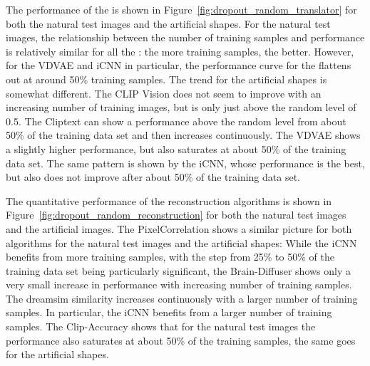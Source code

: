 The performance of the  is shown in Figure~\ref{fig:dropout_random_translator} for both the natural test images and the artificial shapes. For the natural test images, the relationship between the number of training samples and performance is relatively similar for all the : the more training samples, the better. However, for the VDVAE and iCNN in particular, the performance curve for the  flattens out at around 50\% training samples. The trend for the artificial shapes is somewhat different. The CLIP Vision  does not seem to improve with an increasing number of training images, but is only just above the random level of 0.5. The Cliptext  can show a performance above the random level from about 50\% of the training data set and then increases continuously. The VDVAE  shows a slightly higher performance, but also saturates at about 50\% of the training data set. The same pattern is shown by the iCNN, whose performance is the best, but also does not improve after about 50\% of the training data set. 

The quantitative performance of the reconstruction algorithms is shown in Figure~\ref{fig:dropout_random_reconstruction} for both the natural test images and the artificial images. The PixelCorrelation shows a similar picture for both algorithms for the natural test images and the artificial shapes: While the iCNN benefits from more training samples, with the step from 25\% to 50\% of the training data set being particularly significant, the Brain-Diffuser shows only a very small increase in performance with increasing number of training samples. The dreamsim similarity increases continuously with a larger number of training samples. In particular, the iCNN benefits from a larger number of training samples. The Clip-Accuracy shows that for the natural test images the performance also saturates at about 50\% of the training samples, the same goes for the artificial shapes.





